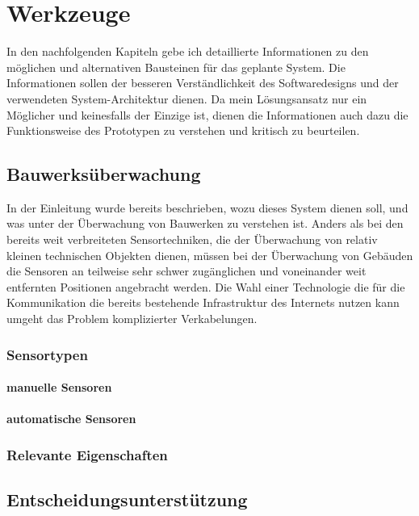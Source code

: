\chapter{Werkzeuge}
In den nachfolgenden Kapiteln gebe ich detaillierte Informationen zu den möglichen und alternativen Bausteinen für das geplante System. Die Informationen sollen der besseren Verständlichkeit des Softwaredesigns und der verwendeten System-Architektur dienen. Da mein Lösungsansatz nur ein Möglicher und keinesfalls der Einzige ist, dienen die Informationen auch dazu die Funktionsweise des Prototypen zu verstehen und kritisch zu beurteilen.


\section{Bauwerksüberwachung}
In der Einleitung wurde bereits beschrieben, wozu dieses System dienen soll, und was unter der Überwachung von Bauwerken zu verstehen ist. Anders als bei den bereits weit verbreiteten Sensortechniken, die der Überwachung von relativ kleinen technischen Objekten dienen, müssen bei der Überwachung von Gebäuden die Sensoren an teilweise sehr schwer zugänglichen und voneinander weit entfernten Positionen angebracht werden. Die Wahl einer Technologie die für die Kommunikation die bereits bestehende Infrastruktur des Internets nutzen kann umgeht das Problem komplizierter Verkabelungen.

\subsection{Sensortypen}
\subsubsection{manuelle Sensoren}
\subsubsection{automatische Sensoren}
\subsection{Relevante Eigenschaften}

\section{Entscheidungsunterstützung}


